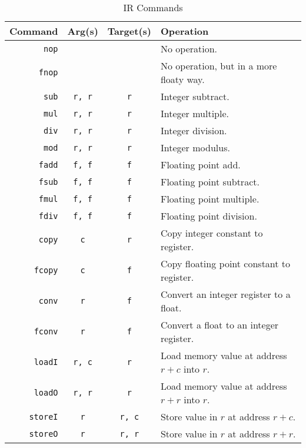 \documentclass[10pt, onecolumn]{extarticle}
\begin{document}
\begin{longtable}{| r | c | c | l |}
  \caption{IR Commands}
  \label{cmdlist}
  \endfirsthead
  \caption{IR Commands}
  \endhead
  \hline
  Command & Arg(s) & Target(s) & Operation\\\hline
  \texttt{nop} & & & No operation.\\\hline
  \texttt{fnop} & & & No operation, but in a more floaty way.\\\hline\hline

  \texttt{sub} & \texttt{r, r} & \texttt{r} & Integer subtract.\\\hline
  \texttt{mul} & \texttt{r, r} & \texttt{r} & Integer multiple.\\\hline
  \texttt{div} & \texttt{r, r} & \texttt{r} & Integer division.\\\hline
  \texttt{mod} & \texttt{r, r} & \texttt{r} & Integer modulus.\\\hline\hline

  \texttt{fadd} & \texttt{f, f} & \texttt{f} & Floating point add.\\\hline
  \texttt{fsub} & \texttt{f, f} & \texttt{f} & Floating point subtract.\\\hline
  \texttt{fmul} & \texttt{f, f} & \texttt{f} & Floating point multiple.\\\hline
  \texttt{fdiv} & \texttt{f, f} & \texttt{f} & Floating point division.\\\hline\hline

  \texttt{copy} & \texttt{c} & \texttt{r} & Copy integer constant to register.\\\hline
  \texttt{fcopy} & \texttt{c} & \texttt{f} & Copy floating point constant to register.\\\hline
  \texttt{conv} & \texttt{r} & \texttt{f} & Convert an integer register to a float.\\\hline
  \texttt{fconv} & \texttt{r} & \texttt{f} & Convert a float to an integer register.\\\hline
  \texttt{loadI} & \texttt{r, c} & \texttt{r} & Load memory value at address $r + c$ into $r$.\\\hline
  \texttt{loadO} & \texttt{r, r} & \texttt{r} & Load memory value at address $r + r$ into $r$.\\\hline
  \texttt{storeI} & \texttt{r} & \texttt{r, c} & Store value in $r$ at address $r + c$.\\\hline
  \texttt{storeO} & \texttt{r} & \texttt{r, r} & Store value in $r$ at address $r + r$.\\\hline\hline


\end{longtable}
\end{document}
